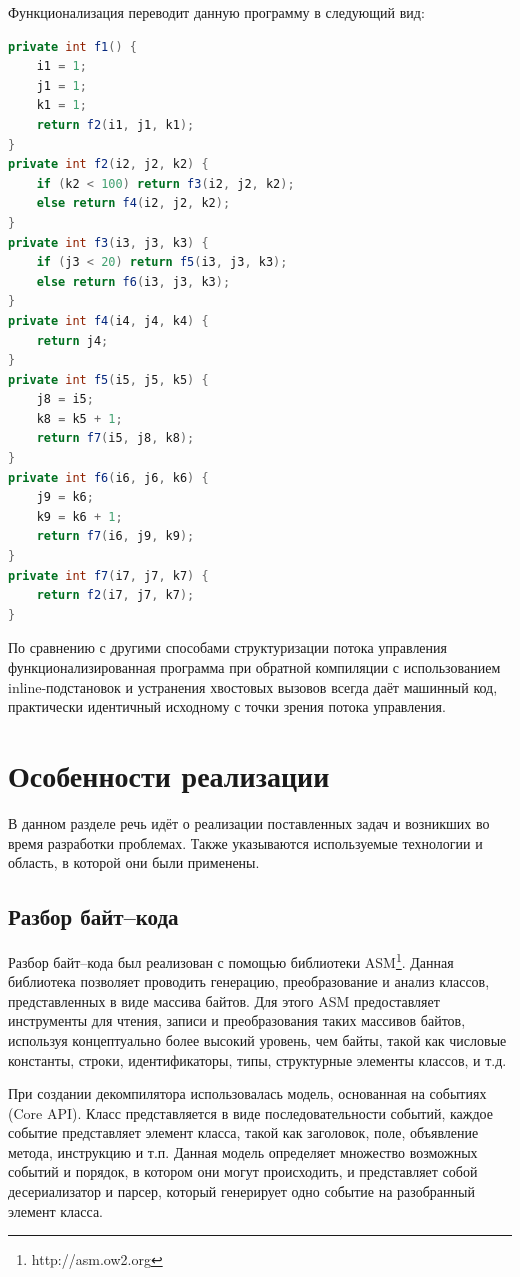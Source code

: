 Функционализация переводит данную программу в следующий вид:\\
\begin{lstlisting}[language = Java]
private int f1() {
	i1 = 1;
	j1 = 1;
	k1 = 1;
	return f2(i1, j1, k1);
}
private int f2(i2, j2, k2) {
	if (k2 < 100) return f3(i2, j2, k2);
	else return f4(i2, j2, k2);	
}
private int f3(i3, j3, k3) {
	if (j3 < 20) return f5(i3, j3, k3);
	else return f6(i3, j3, k3);	
}
private int f4(i4, j4, k4) {
	return j4;
}
private int f5(i5, j5, k5) {
	j8 = i5;
	k8 = k5 + 1;
	return f7(i5, j8, k8);
}
private int f6(i6, j6, k6) {
	j9 = k6;
	k9 = k6 + 1;
	return f7(i6, j9, k9);
}
private int f7(i7, j7, k7) {
	return f2(i7, j7, k7);
}\end{lstlisting}

По сравнению с другими способами структуризации потока управления функционализированная программа при обратной компиляции с использованием inline-подстановок и устранения хвостовых вызовов всегда даёт машинный код, практически идентичный исходному с точки зрения потока управления.

\section{Особенности реализации}

В данном разделе речь идёт о реализации поставленных задач и возникших во время разработки проблемах. Также указываются используемые технологии и область, в которой они были применены.

\subsection{Разбор байт--кода}

Разбор байт--кода был реализован с помощью библиотеки ASM\footnote{http://asm.ow2.org}. Данная библиотека позволяет проводить генерацию, преобразование и анализ классов, представленных в виде массива байтов. Для этого ASM предоставляет инструменты для чтения, записи и преобразования таких массивов байтов, используя концептуально более высокий уровень, чем байты, такой как числовые константы, строки, идентификаторы, типы, структурные элементы классов, и т.д. 	

При создании декомпилятора использовалась модель, основанная на событиях (Core API). Класс представляется в виде последовательности событий, каждое событие представляет элемент класса, такой как заголовок, поле, объявление метода, инструкцию и т.п. Данная модель определяет множество возможных событий и порядок, в котором они могут происходить, и представляет собой десериализатор и парсер, который генерирует одно событие на разобранный элемент класса.

